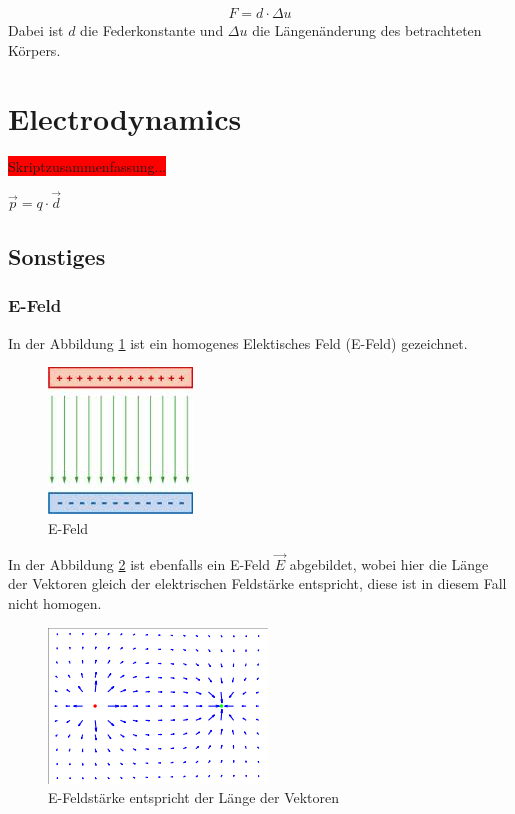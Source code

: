 \documentclass[a4paper]{scrartcl}
\begin{document}
\begin{align}
F=d \cdot \Delta u
\end{align}
Dabei ist $d$ die Federkonstante und $\Delta u$ die Längenänderung des
betrachteten Körpers.

\section{Electrodynamics}

\colorbox{red}{Skriptzusammenfassung...}

$ \vec{p}=q\cdot\vec{d} $


\subsection{Sonstiges}



\subsubsection{E-Feld}

In der Abbildung \ref{fig:E-Feld} ist ein homogenes Elektisches Feld (E-Feld) gezeichnet.

\begin{figure}[h!]
\begin{center}
\includegraphics[scale=0.5]{images/E-Feld.jpg}
\caption{E-Feld}
\label{fig:E-Feld}
\end{center}
\end{figure}

In der Abbildung \ref{fig:E-Feldstaerke} ist ebenfalls ein E-Feld $ \vec{E} $ abgebildet, wobei hier die Länge der Vektoren gleich der elektrischen Feldstärke entspricht, diese ist in diesem Fall nicht homogen.

\begin{figure}[h!]
\begin{center}
\includegraphics[scale=0.5]{images/E-Feldstaerke.png}
\caption{E-Feldstärke entspricht der Länge der Vektoren}
\label{fig:E-Feldstaerke}
\end{center}
\end{figure}
\end{document}
